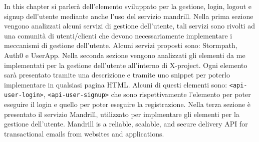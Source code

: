In this chapter si parlerà dell'elemento sviluppato per la gestione, login, logout e signup dell'utente mediante anche l'uso del servizio mandrill. 
Nella prima sezione vengono analizzati alcuni servizi di gestione dell'utente, tali servizi sono rivolti ad una comunità di utenti/clienti che devono necessariamente implementare i meccanismi di gestione dell'utente.
Alcuni servizi proposti sono: Stormpath, Auth0 e UserApp.
Nella seconda sezione vengono analizzati gli elementi da me implementati per la gestione dell'utente all'interno di X-project. Ogni elemento sarà presentato tramite una descrizione e tramite uno snippet per poterlo implementare in qualsiasi pagina HTML. Alcuni di questi elementi sono: \texttt{<api-user-login>}, \texttt{<api-user-signup>} che sono rispettivamente l'elemento per poter eseguire il login e quello per poter eseguire la registrazione.
Nella terza sezione è presentato il servizio Mandrill, utilizzato per implmentare gli elementi per la gestione dell'utente. Mandrill is a reliable, scalable, and secure delivery API for transactional emails from websites and applications.
